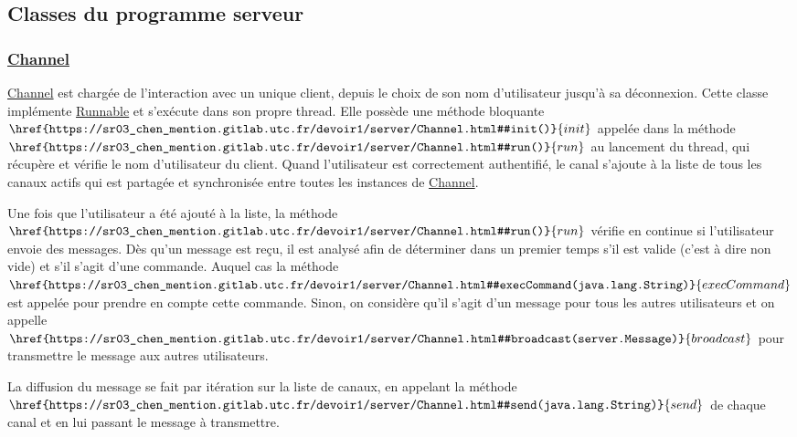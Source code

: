 \documentclass[10pt,a4paper]{article}
\begin{document}
	
	\subsection{Classes du programme serveur}
	
	\subsubsection{\href{https://sr03_chen_mention.gitlab.utc.fr/devoir1/server/Channel.html}{Channel}}
	\href{https://sr03_chen_mention.gitlab.utc.fr/devoir1/server/Channel.html}{Channel} est chargée de l'interaction avec un unique client, depuis le choix de son nom d'utilisateur jusqu'à sa déconnexion. Cette classe implémente \href{https://docs.oracle.com/javase/7/docs/api/java/lang/Runnable.html}{Runnable} et s'exécute dans son propre thread. Elle possède une méthode bloquante $\href{https://sr03_chen_mention.gitlab.utc.fr/devoir1/server/Channel.html#init()}{init}$ appelée dans la méthode $\href{https://sr03_chen_mention.gitlab.utc.fr/devoir1/server/Channel.html#run()}{run}$ au lancement du thread, qui récupère et vérifie le nom d'utilisateur du client. Quand l'utilisateur est correctement authentifié, le canal s'ajoute à la liste de tous les canaux actifs qui est partagée et synchronisée entre toutes les instances de  \href{https://sr03_chen_mention.gitlab.utc.fr/devoir1/server/Channel.html}{Channel}. \par
	
	Une fois que l'utilisateur a été ajouté à la liste, la méthode $\href{https://sr03_chen_mention.gitlab.utc.fr/devoir1/server/Channel.html#run()}{run}$ vérifie en continue si l'utilisateur envoie des messages. Dès qu'un message est reçu, il est analysé afin de déterminer dans un premier temps s'il est valide (c'est à dire non vide) et s'il s'agit d'une commande. Auquel cas la méthode $\href{https://sr03_chen_mention.gitlab.utc.fr/devoir1/server/Channel.html#execCommand(java.lang.String)}{execCommand}$ est appelée pour prendre en compte cette commande. Sinon, on considère qu'il s'agit d'un message pour tous les autres utilisateurs et on appelle $\href{https://sr03_chen_mention.gitlab.utc.fr/devoir1/server/Channel.html#broadcast(server.Message)}{broadcast}$ pour transmettre le message aux autres utilisateurs. \par
	
	La diffusion du message se fait par itération sur la liste de canaux, en appelant la méthode $\href{https://sr03_chen_mention.gitlab.utc.fr/devoir1/server/Channel.html#send(java.lang.String)}{send}$ de chaque canal et en lui passant le message à transmettre. \par
	
\end{document}

